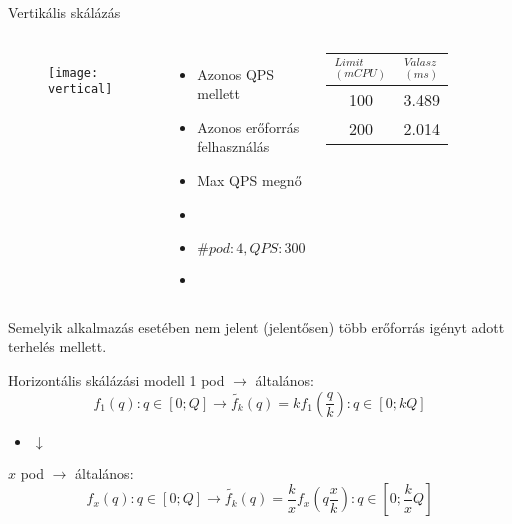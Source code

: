 \documentclass{beamer}
\begin{document}
\begin{frame}[t]{Vertikális skálázás}

\begin{columns}
	\begin{figure}
		\centering
		\texttt{[image: vertical]} 
	\end{figure}

	\begin{itemize}
		\item Azonos QPS mellett
		\item Azonos erőforrás felhasználás 
		\item Max QPS megnő
		\item[]	
		\item[] $\#pod: 4, QPS: 300	$
		\item[]
	\end{itemize}

\begin{tabular}{ c c }
 $_{(mCPU)}^{Limit}$ & $_{(ms)}^{V\acute{a}lasz}$  \\ [0.8ex] 
 \hline
 100 & 3.489  \\ 
 200 & 2.014  \\    
\end{tabular}
\end{columns}
Semelyik alkalmazás esetében nem jelent (jelentősen) több erőforrás igényt adott terhelés mellett. 
\end{frame}



\begin{frame}[t]{Horizontális skálázási modell}
1 pod $\rightarrow$ általános:
\begin{equation}
f_{1}(q):q \in [0;Q] \rightarrow \tilde{f_{k}}(q)=kf_{1}\left ( \frac{q}{k} \right ):q \in [0;kQ] 
\end{equation}
\begin{itemize}
\centering
\item[] $\downarrow$ \\
\end{itemize}

$x$ pod $\rightarrow$ általános:
\begin{equation}
f_{x}(q):q \in [0;Q] \rightarrow \tilde{f_{k}}(q)=\frac{k}{x}f_{x}\left ( q\frac{x}{k} \right ):q \in [0;\frac{k}{x}Q] 
\end{equation}
\end{frame}
\end{document}
